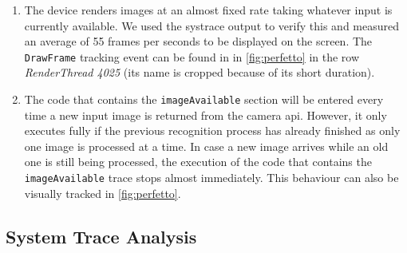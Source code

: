 \documentclass[
			   fontsize=11pt,
               paper=a4,
               bibliography=totoc,
               idxtotoc,
               headsepline,
               footsepline,
               footinclude=false,
               BCOR=12mm,
               DIV=13,
               openany,   %
               ]
               {scrbook}
\newcommand{\code}[1]{\lstinline[basicstyle = \ttfamily\small]{#1}} %
\begin{document}
\begin{enumerate}
	\item The device renders images at an almost fixed rate taking whatever input is currently available. We used the systrace output to verify this and measured an average of 55 frames per seconds to be displayed on the screen. The \code{DrawFrame} tracking event can be found in in \autoref{fig:perfetto} in the row \textit{RenderThread 4025} (its name is cropped because of its short duration).
	\item The code that contains the \code{imageAvailable} section will be entered every time a new input image is returned from the camera \gls{api}. However, it only executes fully if the previous recognition process has already finished as only one image is processed at a time. In case a new image arrives while an old one is still being processed, the execution of the code that contains the \code{imageAvailable} trace stops almost immediately. This behaviour can also be visually tracked in \autoref{fig:perfetto}.
\end{enumerate}

\subsection{System Trace Analysis}
\end{document}
